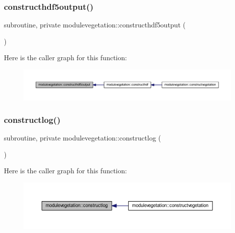 \subsubsection{\texorpdfstring{constructhdf5output()}{constructhdf5output()}}
{\footnotesize\ttfamily subroutine, private modulevegetation\+::constructhdf5output (\begin{DoxyParamCaption}{ }\end{DoxyParamCaption})\hspace{0.3cm}{\ttfamily [private]}}

Here is the caller graph for this function\+:\nopagebreak
\begin{figure}[H]
\begin{center}
\leavevmode
\includegraphics[width=350pt]{namespacemodulevegetation_a687f37b7582103fd8a3308f5602b635f_icgraph}
\end{center}
\end{figure}
\mbox{\label{namespacemodulevegetation_a9159b405f988e18f1d5dda447ae2525d}} 
\subsubsection{\texorpdfstring{constructlog()}{constructlog()}}
{\footnotesize\ttfamily subroutine, private modulevegetation\+::constructlog (\begin{DoxyParamCaption}{ }\end{DoxyParamCaption})\hspace{0.3cm}{\ttfamily [private]}}

Here is the caller graph for this function\+:\nopagebreak
\begin{figure}[H]
\begin{center}
\leavevmode
\includegraphics[width=350pt]{namespacemodulevegetation_a9159b405f988e18f1d5dda447ae2525d_icgraph}
\end{center}
\end{figure}
\mbox{\label{namespacemodulevegetation_ac179d0f21b5052db939c21c142a5dda5}} 
